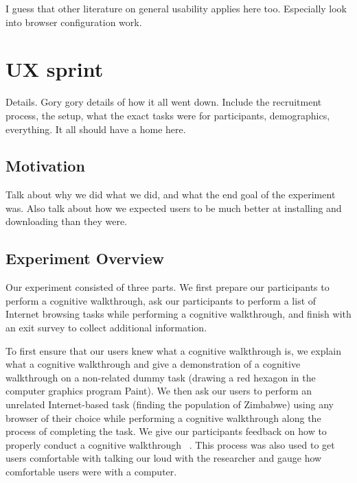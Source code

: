 \documentclass[letterpaper,twocolumn,11pt]{article}
\begin{document}
{\color {red}  I guess that other literature on general usability applies here too. %
Especially look into browser configuration work. }

\appendix

\section{UX sprint} 
\label{sec:pilot}
 {\color {red}Details. Gory gory details of how it all went down. 
Include the recruitment process, the setup, what the exact 
tasks were for participants, demographics, everything. 
It all should have a home here.}


\subsection{Motivation}
{\color {red} Talk about why we did what we did, and what the end goal 
of the experiment was. Also talk about how we expected users
to be much better at installing and downloading than they were. }

\subsection{Experiment Overview}
\indent \indent Our experiment consisted of three parts. We first prepare our participants to perform a 
cognitive walkthrough, ask our participants to perform a list of Internet browsing 
tasks while performing a cognitive walkthrough, and finish with an exit survey to collect 
additional information. 

To first ensure that our users knew what a cognitive walkthrough is, we explain what a cognitive
walkthrough and give a demonstration of a cognitive walkthrough on a non-related dummy task 
(drawing a red hexagon in the computer graphics program Paint). We then ask our users to perform
an unrelated Internet-based task (finding the population of Zimbabwe) using any browser of their choice
while performing a cognitive walkthrough along the process of completing the task. We give our 
participants feedback on how to properly conduct a cognitive walkthrough ~\cite{wharton1994cognitive}.
This process was also used to get users comfortable with talking our loud with the researcher and gauge 
how comfortable users were with a computer.
\end{document}
